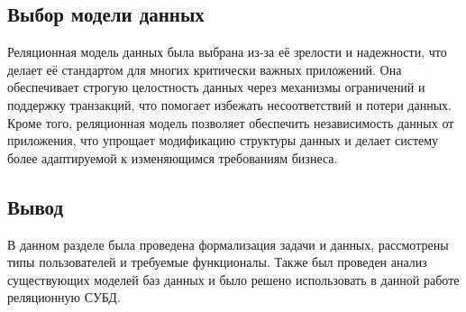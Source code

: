 \subsection{Выбор модели данных}

Реляционная модель данных была выбрана из-за её зрелости и надежности, что делает её стандартом для многих критически важных приложений. Она обеспечивает строгую целостность данных через механизмы ограничений и поддержку транзакций, что помогает избежать несоответствий и потери данных. Кроме того, реляционная модель позволяет обеспечить независимость данных от приложения, что упрощает модификацию структуры данных и делает систему более адаптируемой к изменяющимся требованиям бизнеса. \cite{god}

\subsection*{Вывод}

В данном разделе была проведена формализация задачи и данных, рассмотрены типы пользователей и требуемые функционалы. Также был проведен анализ существующих моделей баз данных и было решено использовать в данной работе реляционную СУБД.

